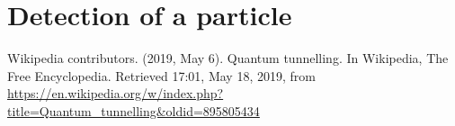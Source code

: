 \documentclass[a4paper,12pt,twoside]{article}
\begin{document}

\newpage
\section{Detection of a particle}





  \newpage
  \begin{thebibliography}{99}
     Wikipedia contributors. (2019, May 6). Quantum tunnelling. In Wikipedia, The Free Encyclopedia. Retrieved 17:01, May 18, 2019, from \url{https://en.wikipedia.org/w/index.php?title=Quantum_tunnelling&oldid=895805434}


  \end{thebibliography}
\end{document}
